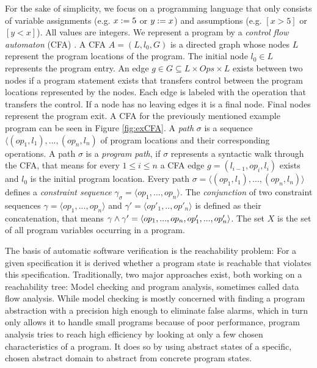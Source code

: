 For the sake of simplicity, we focus on a programming language that only consists of variable assignments (e.g. $x := 5$ or $y := x$) and assumptions (e.g. $[x > 5]$ or $[y < x]$).
All values are integers.
We represent a program by a \emph{control flow automaton} (CFA) \cite{BeyerBook}\cite{Beyer2012}.
A CFA $A = (L, l_0, G)$ is a directed graph whose nodes $L$ represent the program locations of the program.
The initial node $l_0 \in L$ represents the program entry.
An edge $g \in G \subseteq L \times Ops \times L$ exists between two nodes if a program statement exists that transfers control between the program locations represented by the nodes.
Each edge is labeled with the operation that transfers the control.
If a node has no leaving edges it is a final node. Final nodes represent the program exit.
A CFA for the previously mentioned example program can be seen in Figure \ref{fig:exCFA}.
A \emph{path} $\sigma$ \cite{Beyer2015} is a sequence $\langle (op_1, l_1), ..., (op_n, l_n)$ of program locations and their corresponding operations.
A path $\sigma$ is a \emph{program path}, if $\sigma$ represents a syntactic walk through the CFA, that means for every $1 \leq i \leq n$ a CFA edge $g = (l_{i-1}, op_i, l_i)$ exists and $l_0$ is the initial program location.
Every path $\sigma = \langle (op_1, l_1), ..., (op_n, l_n) \rangle$ defines a \emph{constraint sequence} $\gamma_\sigma = \langle op_1, ..., op_n \rangle$.
The \emph{conjunction} of two constraint sequences $\gamma = \langle op_1, ..., op_n \rangle$ and $\gamma' = \langle op'_1, .., op'_n \rangle$ is defined as their concatenation,
that means $\gamma \wedge \gamma' = \langle op_1, ..., op_n, op'_1, ..., op'_n \rangle$.
The set $X$ is the set of all program variables occurring in a program.

The basis of automatic software verification is the reachability problem: For a given specification it is derived whether a program state is reachable that violates this specification.
Traditionally, two major approaches exist, both working on a reachability tree: Model checking and program analysis, sometimes called data flow analysis.
While model checking is mostly concerned with finding a program abstraction with a precision high enough to eliminate false alarms,
which in turn only allows it to handle small programs because of poor performance,
program analysis tries to reach high efficiency by looking at only a few chosen characteristics of a program. %
It does so by using abstract states of a specific, chosen abstract domain to abstract from concrete program states.


